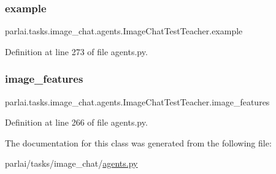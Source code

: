 \subsubsection{\texorpdfstring{example}{example}}
{\footnotesize\ttfamily parlai.\+tasks.\+image\+\_\+chat.\+agents.\+Image\+Chat\+Test\+Teacher.\+example}



Definition at line 273 of file agents.\+py.

\mbox{\label{classparlai_1_1tasks_1_1image__chat_1_1agents_1_1ImageChatTestTeacher_a80425539c895043b514564eb38961bf6}} 
\subsubsection{\texorpdfstring{image\+\_\+features}{image\_features}}
{\footnotesize\ttfamily parlai.\+tasks.\+image\+\_\+chat.\+agents.\+Image\+Chat\+Test\+Teacher.\+image\+\_\+features}



Definition at line 266 of file agents.\+py.



The documentation for this class was generated from the following file\+:\begin{DoxyCompactItemize}
\item 
parlai/tasks/image\+\_\+chat/\hyperlink{parlai_2tasks_2image__chat_2agents_8py}{agents.\+py}\end{DoxyCompactItemize}
